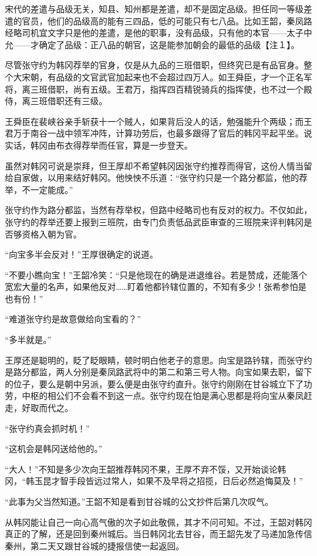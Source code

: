 宋代的差遣与品级无关，知县、知州都是差遣，却不是固定品级。担任同一等级差遣的官员，他们的品级高的能有三四品，低的可能只有七八品。比如王韶，秦凤路经略司机宜文字只是他的差遣，是他的职事，没有品级，只有他的本官——太子中允——才确定了品级：正八品的朝官，这是能参加朝会的最低的品级【注１】。

尽管张守约为韩冈荐举的官身，仅是从九品的三班借职，但终究已是有品官身。整个大宋朝，有品级的文官武官加起来也不会超过四万人。如王舜臣，才一个正名军将，离三班借职，尚有五级。王君万，指挥四百精锐骑兵的指挥使，也不过一个殿侍，离三班借职还有三级。

王舜臣在裴峡谷亲手斩获十一个贼人，如果背后没人的话，勉强能升个两级；而王君万于南谷一战中领军冲阵，计算功劳后，也最多跟得了官后的韩冈平起平坐。说实话，韩冈由布衣得荐举而任官，算是一步登天。

虽然对韩冈可说是崇拜，但王厚却不希望韩冈因张守约推荐而得官，这份人情当留给自家做，以用来结好韩冈。他怏怏不乐道：“张守约只是一个路分都监，他的荐举，不一定能成。”

张守约作为路分都监，当然有荐举权，但路中经略司也有反对的权力。不仅如此，张守约的荐举还要上报到三班院，由专门负责低品武臣审查的三班院来评判韩冈是否够资格入朝为官。

“向宝多半会反对！”王厚很确定的说道。

“不要小瞧向宝！”王韶冷笑：“只是他现在的确是进退维谷。若是赞成，还能落个宽宏大量的名声，如果他反对……盯着他都钤辖位置的，不知有多少！张希参怕是也有份！”

“难道张守约是故意做给向宝看的？”

“多半就是。”

王厚还是聪明的，眨了眨眼睛，顿时明白他老子的意思。向宝是路钤辖，而张守约是路分都监，两人分别是秦凤路武将中的第二和第三号人物。向宝如果去职，留下的位子，要么是朝中另派，要么便是由张守约直升。张守约刚刚在甘谷城立下了功劳，中枢的相公们不会看不到这一点。张守约现在怕是满心思都是将向宝从秦凤赶走，好取而代之。

“张守约真会抓时机！”

“这机会是韩冈送给他的。”

“大人！”不知是多少次向王韶推荐韩冈不果，王厚不弃不馁，又开始谈论韩冈，“韩玉昆才智手段皆远过常人，如果不及早将之招揽，日后必然追悔莫及！”

“此事为父当然知道。”王韶不知是看到甘谷城的公文抄件后第几次叹气。

从韩冈能让自己一向心高气傲的次子如此敬佩，其才不问可知。不过，王韶对韩冈真正的了解，还是回到秦州城后。当日韩冈北去甘谷，而王韶先发了马递加急传信秦州，第二天又跟甘谷城的捷报信使一起返回。


